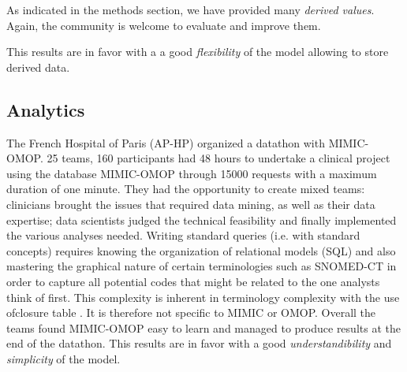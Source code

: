 As indicated in the methods section, we have provided many \emph{derived values}. 
Again, the community is welcome to evaluate and improve them.   

This results are in favor with a a good \textit{flexibility} of the model
allowing to store derived data.

%
%

\subsection{Analytics}

%
%

The French Hospital of Paris (AP-HP) organized a datathon with MIMIC-OMOP. 
25 teams, 160 participants had 48 hours to undertake a clinical project using 
the database MIMIC-OMOP through 15000 requests with a maximum duration of
one minute. They had the opportunity to create mixed teams: clinicians brought 
the issues that required data mining, as well as their data expertise; 
data scientists judged the technical feasibility and finally implemented the 
various analyses needed. Writing standard queries (i.e. with standard concepts) 
requires knowing the organization of relational models (SQL) and also mastering 
the graphical nature of certain terminologies such as SNOMED-CT in order to 
capture all potential codes that might be related to the one analysts think of 
first. This complexity is inherent in terminology complexity with the use ofclosure
table \cite{closure-table}. It is therefore not specific to MIMIC or OMOP.
Overall the teams found MIMIC-OMOP easy to learn and managed to produce results
at the end of the datathon.
This results are in favor with a good \textit{understandibility} and
\textit{simplicity} of the model.

